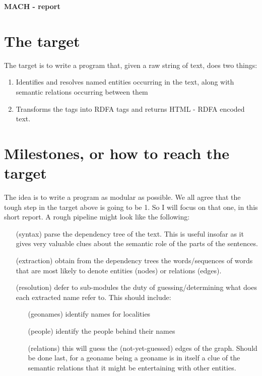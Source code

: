 \documentclass[11pt,leqno,fleqn]{article}
\begin{document}
\pagestyle{fancy}
\begin{center} \textbf{MACH - report} \end{center}

\section{The target}

The target is to write a program that, given a raw string of text, does two things:
\begin{enumerate}
\item Identifies and resolves named entities occurring in the text, along with semantic relations occurring between them
\item Transforms the tags into RDFA tags and returns HTML - RDFA encoded text.
\end{enumerate}

\section{Milestones, or how to reach the target}

The idea is to write a program as modular as possible. We all agree that the tough step in the target above is going to be 1. So I will focus on that one, in this short report. A rough pipeline might look like the following:
\begin{enumerate}
\item [(syntax)] parse the dependency tree of the text. This is useful insofar as it gives very valuable clues about the semantic role of the parts of the sentences.
\item [(extraction)] obtain from the dependency trees the words/sequences of words that are most likely to denote entities (nodes) or relations (edges).
\item [(resolution)] defer to sub-modules the duty of guessing/determining what does each extracted name refer to. This should include:
\begin{itemize}
\item [(geonames)] identify names for localities
\item [(people)] identify the people behind their names
\item [(relations)] this will guess the (not-yet-guessed) edges of the graph. Should be done last, for a geoname being a geoname is in itself a clue of the semantic relations that it might be entertaining with other entities.
\end{itemize}
\end{enumerate}
\end{document}
